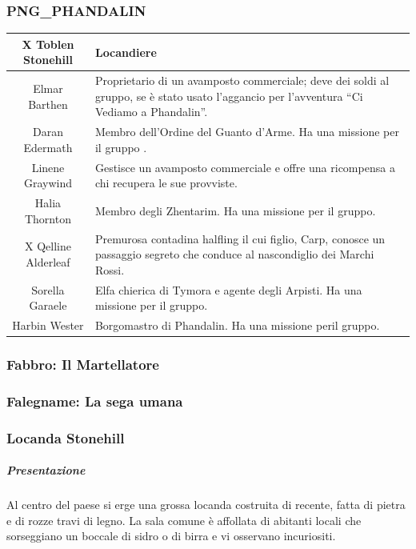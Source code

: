 \documentclass{article}
\begin{document}
\subsubsection{PNG\_PHANDALIN}
\begin{table}[h]
    
    \begin{tabular}{|c|p{10cm}|}
        \hline
      X Toblen Stonehill &  Locandiere\\
       \hline
Elmar Barthen  & Proprietario di un avamposto commerciale;
deve dei soldi al gruppo, se è stato usato
l’aggancio per l'avventura “Ci Vediamo a
Phandalin”.   \\
    \hline
        Daran Edermath & Membro dell'Ordine del Guanto d’Arme. Ha
una missione per il gruppo .\\
    \hline
    Linene Graywind & Gestisce un avamposto commerciale e
offre una ricompensa a chi recupera le sue
provviste.\\
    \hline
    Halia Thornton & Membro degli Zhentarim. Ha una missione
per il gruppo.\\ \hline
X Qelline Alderleaf & Premurosa contadina halfling il cui figlio,
Carp, conosce un passaggio segreto che
conduce al nascondiglio dei Marchi Rossi.\\ \hline
Sorella Garaele & Elfa chierica di Tymora e agente degli Arpisti.
Ha una missione per il gruppo. \\ \hline
Harbin Wester & Borgomastro di Phandalin. Ha una missione
peril gruppo. \\ \hline
    \end{tabular}
\end{table}



\subsubsection{Fabbro: Il Martellatore}
\subsubsection{Falegname: La sega umana}

\subsubsection{Locanda Stonehill}
\subparagraph{Presentazione}
Al centro del paese si erge una grossa locanda costruita di
recente, fatta di pietra e di rozze travi di legno. La sala comune
è affollata di abitanti locali che sorseggiano un boccale di sidro
o di birra e vi osservano incuriositi.
\end{document}
